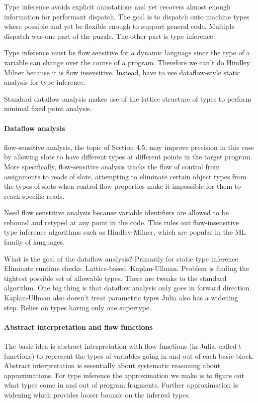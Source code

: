 \documentclass[pldi]{sigplanconf-pldi15}
\begin{document}
Type inference avoids explicit annotations and yet recovers almost enough information for performant dispatch. The goal is to dispatch onto machine types where possible and yet be flexible enough to support general code. Multiple dispatch was one part of the puzzle. The other part is type inference.

Type inference must be flow sensitive for a dynamic language since the type of a variable can change over the course of a program. Therefore we can't do Hindley Milner because it is flow insensitive. Instead, have to use dataflow-style static analysis for type inference.

Standard dataflow analysis makes use of the lattice structure of types to perform minimal fixed point analysis.

\paragraph{Dataflow analysis}
 flow-sensitive analysis, the topic of Section 4.5,
may improve precision in this case by allowing slots to have different types at different points in the target program.
More specifically, flow-sensitive analysis tracks the flow of control from assignments to reads of slots, attempting to
eliminate certain object types from the types of slots when control-flow properties make it impossible for them to
reach specific reads.

Need flow senstitive analysis because variable identifiers are allowed to be rebound and retyped at any point in the code. This rules out flow-insensitive type inference algorithms such as Hindley-Milner, which are popular in the ML family of languages.

What is the goal of the dataflow analysis? Primarily for static type inference. Eliminate runtime checks. Lattice-based. Kaplan-Ullman.
Problem is finding the tightest possible set of allowable types.
There are tweaks to the standard algorithm. One big thing is that dataflow analysis only goes in forward direction.
Kaplan-Ullman also doesn't treat parametric types
Julia also has a widening step.
Relies on types having only one supertype.





\paragraph{Abstract interpretation and flow functions}
The basic idea is abstract interpretation with flow functions (in Julia, called
t-functions) to represent the types of variables going in and out of each basic
block.  Abstract interpretation is essentially about systematic reasoning about
approximations. For type inference the approximation we make is to figure out
what types come in and out of program fragments. Further approximation is
widening which provides looser bounds on the inferred types. 
\end{document}
